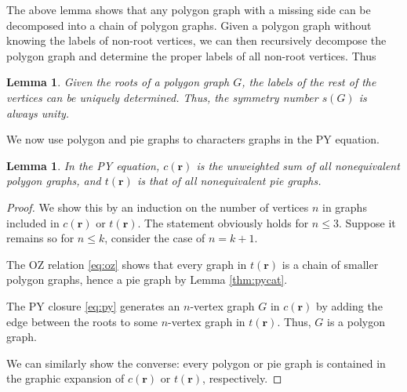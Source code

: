 \documentclass[preprint]{revtex4-1}
\newtheorem{lemm}[thrm]{Lemma}
\newcommand{\vct}[1]{\mathbf{#1}}
\providecommand{\vr}{} %
\renewcommand{\vr}{\vct{r}}
\begin{document}
The above lemma shows that
any polygon graph with a missing side
can be decomposed into a chain of polygon graphs.
%
Given a polygon graph without knowing the labels of non-root vertices,
we can then recursively decompose the polygon graph
and determine the proper labels of all non-root vertices.
%
Thus

\begin{lemm}
Given the roots of a polygon graph $G$,
  the labels of the rest of the vertices
  can be uniquely determined.
Thus,
  the symmetry number $s(G)$ is always unity.
  \label{thm:polygonsymnum}
\end{lemm}



We now use polygon and pie graphs to characters
  graphs in the PY equation.

\begin{lemm}
In the PY equation,
  $c(\vr)$ is the unweighted sum of
  all nonequivalent polygon graphs,
  and $t(\vr)$ is that of all nonequivalent
  pie graphs\cite{rice1965}.
\label{thm:pycrsum}
\end{lemm}

\begin{proof}
We show this by an induction on the number of vertices $n$ in
  graphs included in $c(\vr)$ or $t(\vr)$.
%
The statement obviously holds for $n \le 3$.
%
Suppose it remains so for $n \le k$,
consider the case of $n = k + 1$.

The OZ relation \eqref{eq:oz}
  shows that every graph in $t(\vr)$
  is a chain of smaller polygon graphs,
  hence a pie graph by Lemma \ref{thm:pycat}.

The PY closure \eqref{eq:py} generates
  an $n$-vertex graph $G$ in $c(\vr)$
  by adding the edge between the roots
  to some $n$-vertex graph in $t(\vr)$.
%
Thus, $G$ is a polygon graph.

We can similarly show the converse:
  every polygon or pie graph
  is contained in the graphic expansion
  of $c(\vr)$ or $t(\vr)$,
  respectively.
\end{proof}


\end{document}
